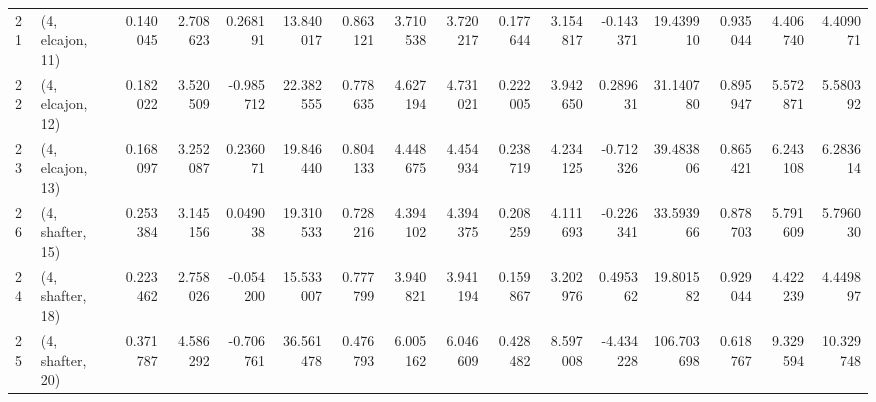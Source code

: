 \begin{tabular}{llrrrrrrrrrrrrrr}
21 &  (4, elcajon, 11) &   0.140045 &  2.708623 &  0.268191 &  13.840017 &  0.863121 &   3.710538 &  3.720217 &  0.177644 &   3.154817 & -0.143371 &   19.439910 &  0.935044 &   4.406740 &   4.409071 \\
22 &  (4, elcajon, 12) &   0.182022 &  3.520509 & -0.985712 &  22.382555 &  0.778635 &   4.627194 &  4.731021 &  0.222005 &   3.942650 &  0.289631 &   31.140780 &  0.895947 &   5.572871 &   5.580392 \\
23 &  (4, elcajon, 13) &   0.168097 &  3.252087 &  0.236071 &  19.846440 &  0.804133 &   4.448675 &  4.454934 &  0.238719 &   4.234125 & -0.712326 &   39.483806 &  0.865421 &   6.243108 &   6.283614 \\
26 &  (4, shafter, 15) &   0.253384 &  3.145156 &  0.049038 &  19.310533 &  0.728216 &   4.394102 &  4.394375 &  0.208259 &   4.111693 & -0.226341 &   33.593966 &  0.878703 &   5.791609 &   5.796030 \\
24 &  (4, shafter, 18) &   0.223462 &  2.758026 & -0.054200 &  15.533007 &  0.777799 &   3.940821 &  3.941194 &  0.159867 &   3.202976 &  0.495362 &   19.801582 &  0.929044 &   4.422239 &   4.449897 \\
25 &  (4, shafter, 20) &   0.371787 &  4.586292 & -0.706761 &  36.561478 &  0.476793 &   6.005162 &  6.046609 &  0.428482 &   8.597008 & -4.434228 &  106.703698 &  0.618767 &   9.329594 &  10.329748 \\
\bottomrule
\end{tabular}
